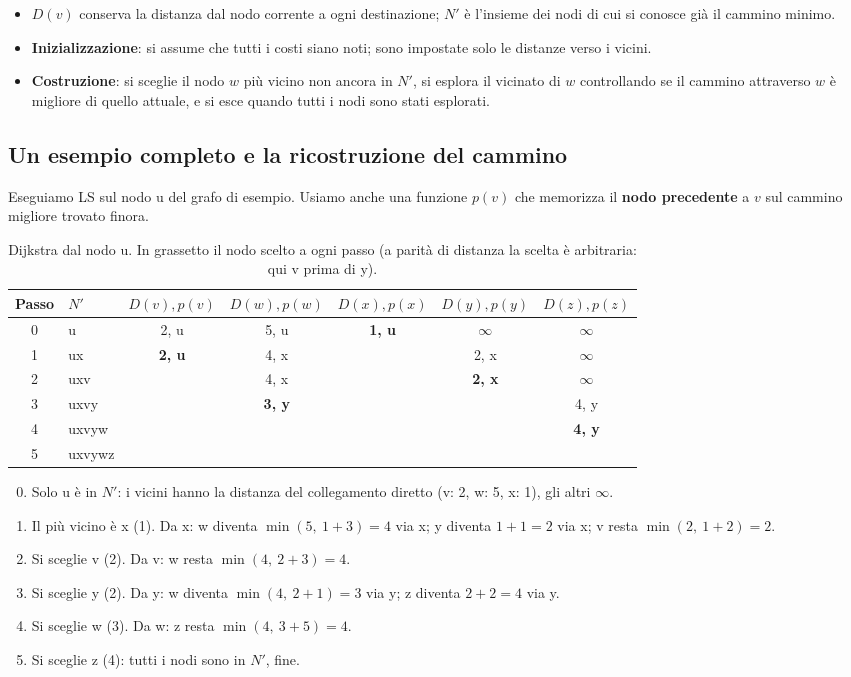 \begin{itemize}
    \item $D(v)$ conserva la distanza dal nodo corrente a ogni destinazione; $N'$ è l'insieme dei nodi di cui si conosce già il cammino minimo.
    \item \textbf{Inizializzazione}: si assume che tutti i costi siano noti; sono impostate solo le distanze verso i vicini.
    \item \textbf{Costruzione}: si sceglie il nodo $w$ più vicino non ancora in $N'$, si esplora il vicinato di $w$ controllando se il
          cammino attraverso $w$ è migliore di quello attuale, e si esce quando tutti i nodi sono stati esplorati.
\end{itemize}

\subsection{Un esempio completo e la ricostruzione del cammino}

Eseguiamo LS sul nodo u del grafo di esempio. Usiamo anche una funzione $p(v)$ che memorizza il \textbf{nodo precedente} a $v$ sul
cammino migliore trovato finora.

\begin{table}[H]
\centering
\begin{tabular}{clccccc}
\toprule
\textbf{Passo} & $N'$ & $D(v), p(v)$ & $D(w), p(w)$ & $D(x), p(x)$ & $D(y), p(y)$ & $D(z), p(z)$ \\
\midrule
0 & u & 2, u & 5, u & \textbf{1, u} & $\infty$ & $\infty$ \\
1 & ux & \textbf{2, u} & 4, x & & 2, x & $\infty$ \\
2 & uxv & & 4, x & & \textbf{2, x} & $\infty$ \\
3 & uxvy & & \textbf{3, y} & & & 4, y \\
4 & uxvyw & & & & & \textbf{4, y} \\
5 & uxvywz & & & & & \\
\bottomrule
\end{tabular}
\caption{Dijkstra dal nodo u. In grassetto il nodo scelto a ogni passo (a parità di distanza la scelta è arbitraria: qui v prima di y).}
\end{table}

\begin{enumerate}
    \setcounter{enumi}{-1}
    \item Solo u è in $N'$: i vicini hanno la distanza del collegamento diretto (v: 2, w: 5, x: 1), gli altri $\infty$.
    \item Il più vicino è x (1). Da x: w diventa $\min(5,\ 1+3) = 4$ via x; y diventa $1 + 1 = 2$ via x; v resta $\min(2,\ 1+2) = 2$.
    \item Si sceglie v (2). Da v: w resta $\min(4,\ 2+3) = 4$.
    \item Si sceglie y (2). Da y: w diventa $\min(4,\ 2+1) = 3$ via y; z diventa $2 + 2 = 4$ via y.
    \item Si sceglie w (3). Da w: z resta $\min(4,\ 3+5) = 4$.
    \item Si sceglie z (4): tutti i nodi sono in $N'$, fine.
\end{enumerate}

